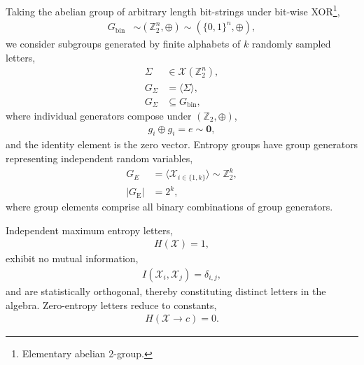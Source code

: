 \documentclass[twocolumn, aps, amsmath, amssymb, nofootinbib, superscriptaddress, longbibliography, doublefloatfix, table-of-contents, eqsecnum, rmp]{revtex4-2}
\def\zerovec{\mathbf{0}}
\begin{document}
Taking the abelian group of arbitrary length bit-strings under bit-wise XOR\footnote{Elementary abelian 2-group.},
\begin{align}
	G_\mathrm{bin} &\sim (\mathbb{Z}_2^n,\oplus) \sim  (\{0,1\}^n,\oplus),
\end{align}
we consider subgroups generated by finite alphabets of $k$ randomly sampled letters,
\begin{align}
	\Sigma &\in \mathcal{X}(\mathbb{Z}_2^n),\nonumber\\ %
	G_\Sigma &= \langle \Sigma \rangle, \nonumber\\
	G_\Sigma &\subseteq G_\mathrm{bin},
\end{align}
where individual generators compose under $(\mathbb{Z}_2,\oplus)$,
\begin{align}
	g_i\oplus g_i = e \sim \zerovec,
\end{align}
and the identity element is the zero vector. Entropy groups have group generators representing independent random variables,
\begin{align}
	G_E &= \langle \mathcal{X}_{i\in\{1,k\}} \rangle \sim \mathbb{Z}_2^k,\nonumber\\
	|G_\mathrm{E}| &= 2^k,
\end{align}
where group elements comprise all binary combinations of group generators.

Independent maximum entropy letters,
\begin{align}
	H(\mathcal{X}) = 1,
\end{align}
exhibit no mutual information,
\begin{align}
	I(\mathcal{X}_i,\mathcal{X}_j) = \delta_{i,j},
\end{align}
and are statistically orthogonal, thereby constituting distinct letters in the algebra. Zero-entropy letters reduce to constants,
\begin{align}
	H(\mathcal{X} \to c) = 0.
\end{align}
\end{document}
